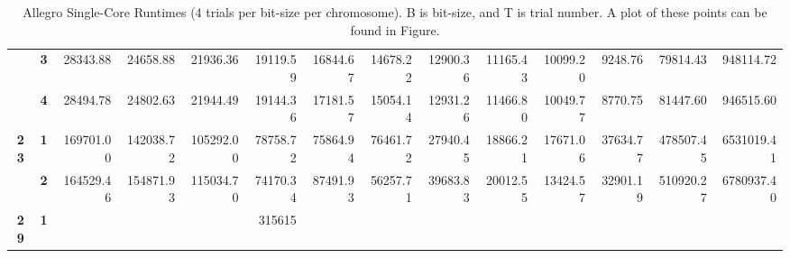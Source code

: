 \begin{table}[h!]
{\begin{tabular}{@{} ccrrrrrrrrrrrr}
\textbf{}   & \textbf{3}                     & 28343.88                         & 24658.88                         & 21936.36                         & 19119.59                         & 16844.67                         & 14678.22                         & 12900.36                         & 11165.43                         & 10099.20                         & 9248.76                          & 79814.43                        & 948114.72                          \\
\textbf{}   & \textbf{4}                     & 28494.78                         & 24802.63                         & 21944.49                         & 19144.36                         & 17181.57                         & 15054.14                         & 12931.26                         & 11466.80                         & 10049.77                         & 8770.75                          & 81447.60                        & 946515.60                          \\
\textbf{23} & \textbf{1}                     & 169701.00                        & 142038.72                        & 105292.00                        & 78758.72                         & 75864.94                         & 76461.72                         & 27940.45                         & 18866.21                         & 17671.06                         & 37634.77                         & 478507.45                       & 6531019.41                         \\
\textbf{}   & \textbf{2}                     & 164529.46                        & 154871.93                        & 115034.70                        & 74170.34                         & 87491.93                         & 56257.71                         & 39683.83                         & 20012.55                         & 13424.57                         & 32901.19                         & 510920.27                       & 6780937.40                         \\
\textbf{29} & \textbf{1}                     &                                  &                                  &                                  & 315615                           &                                  &                                  &                                  &                                  &                                  &                                  &                                 &                                   
\end{tabular}
}
\caption[Allegro Single-Core runtimes, 4 trials per chromosome, per bit-size]{Allegro Single-Core Runtimes (4 trials per bit-size per chromosome). B is bit-size, and T is trial number. A plot of these points can be found in Figure.}
\end{table}

